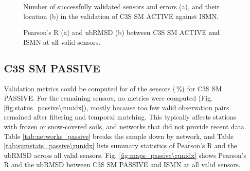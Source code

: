 \begin{figure}[ht!]
\centering
\begin{minipage}[c]{0.34\textwidth}
    \centering
    \subcaption{} %
\end{minipage}%
\hfill
\begin{minipage}[c]{0.64\textwidth}
    \centering
    \subcaption{} %
\end{minipage}
\caption{Number of successfully validated sensors and errors (a), and their location (b) in the validation of \ac{C3S} SM ACTIVE against \ac{ISMN}.}
\label{fig:status_active\runidx}
\end{figure}

\begin{figure}[ht!]
\centering
\begin{subfigure}{\textwidth}
    \centering
    \caption{}
\end{subfigure}
\medskip
\begin{subfigure}{\textwidth}
    \centering
    \caption{}
\end{subfigure}
\caption{Pearson's R (a) and \ac{ubRMSD} (b) between \ac{C3S} SM ACTIVE and \ac{ISMN} at all valid sensors.}
\label{fig:maps_active\runidx}
\end{figure}

\FloatBarrier

\subsection{\ac{C3S} SM PASSIVE} \label{ssec:results_passive}

\noindent Validation metrics could be computed for \textbf{} of the  sensors (\,\%) for \ac{C3S} SM PASSIVE.
For the remaining  sensors, no metrics were computed (Fig. \ref{fig:status_passive\runidx}), mostly because too few valid observation pairs remained after filtering and temporal matching.
This typically affects stations with frozen or snow-covered soils, and networks that did not provide recent data.
Table \ref{tab:networks_passive} breaks the sample down by network, and Table \ref{tab:sumstats_passive\runidx} lists summary statistics of Pearson's R and the \ac{ubRMSD} across all valid sensors.
Fig. \ref{fig:maps_passive\runidx} shows Pearson's R and the \ac{ubRMSD} between \ac{C3S} SM PASSIVE and \ac{ISMN} at all valid sensors.

